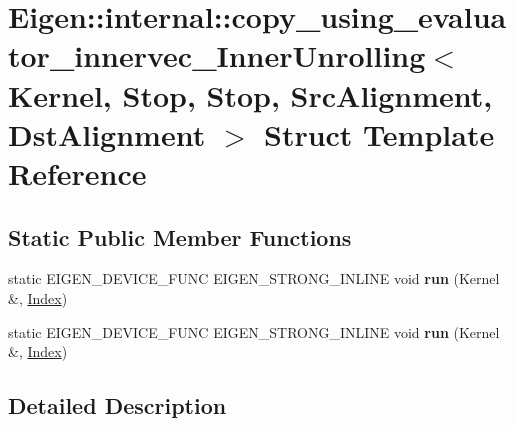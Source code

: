 \hypertarget{struct_eigen_1_1internal_1_1copy__using__evaluator__innervec___inner_unrolling_3_01_kernel_00_01f9638de23111656da8d7300be7918511}{}\section{Eigen\+:\+:internal\+:\+:copy\+\_\+using\+\_\+evaluator\+\_\+innervec\+\_\+\+Inner\+Unrolling$<$ Kernel, Stop, Stop, Src\+Alignment, Dst\+Alignment $>$ Struct Template Reference}
\label{struct_eigen_1_1internal_1_1copy__using__evaluator__innervec___inner_unrolling_3_01_kernel_00_01f9638de23111656da8d7300be7918511}
\subsection*{Static Public Member Functions}
\begin{DoxyCompactItemize}
\item 
\mbox{\label{struct_eigen_1_1internal_1_1copy__using__evaluator__innervec___inner_unrolling_3_01_kernel_00_01f9638de23111656da8d7300be7918511_aa4b8cc41b2fd619fa21cb57414053b68}} 
static E\+I\+G\+E\+N\+\_\+\+D\+E\+V\+I\+C\+E\+\_\+\+F\+U\+NC E\+I\+G\+E\+N\+\_\+\+S\+T\+R\+O\+N\+G\+\_\+\+I\+N\+L\+I\+NE void {\bfseries run} (Kernel \&, \hyperlink{namespace_eigen_a62e77e0933482dafde8fe197d9a2cfde}{Index})
\item 
\mbox{\label{struct_eigen_1_1internal_1_1copy__using__evaluator__innervec___inner_unrolling_3_01_kernel_00_01f9638de23111656da8d7300be7918511_aa4b8cc41b2fd619fa21cb57414053b68}} 
static E\+I\+G\+E\+N\+\_\+\+D\+E\+V\+I\+C\+E\+\_\+\+F\+U\+NC E\+I\+G\+E\+N\+\_\+\+S\+T\+R\+O\+N\+G\+\_\+\+I\+N\+L\+I\+NE void {\bfseries run} (Kernel \&, \hyperlink{namespace_eigen_a62e77e0933482dafde8fe197d9a2cfde}{Index})
\end{DoxyCompactItemize}


\subsection{Detailed Description}
